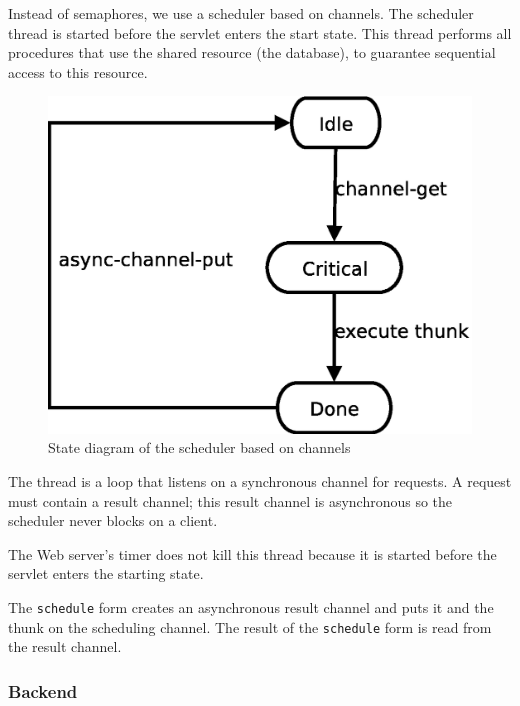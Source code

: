 \documentclass[a4paper]{article}
\begin{document}
Instead of semaphores, we use a scheduler based on channels. The scheduler
thread is started before the servlet enters the start state. This thread
performs all procedures that use the shared resource (the database), to
guarantee sequential access to this resource.

\begin{figure}[ht]
\centering
\includegraphics[scale=.30]{channel.eps}
\caption{State diagram of the scheduler based on channels}
\label{fig:channel}
\end{figure}

The thread is a loop that listens on a synchronous channel for requests. A
request must contain a result channel; this result channel is asynchronous so
the scheduler never blocks on a client.

The Web server's timer does not kill this thread because it is started before
the servlet enters the starting state. 

The \verb|schedule| form creates an asynchronous result channel and puts it and
the thunk on the scheduling channel. The result of the \verb|schedule| form is
read from the result channel.


\subsubsection{Backend}\label{subsubsec:backend}
\end{document}
